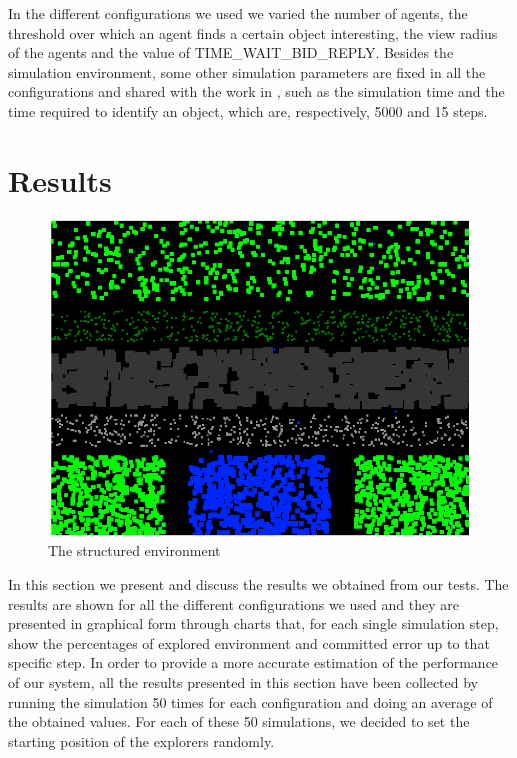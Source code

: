 \documentclass[a4paper, 10pt, conference]{ieeeconf}      %
\begin{document}
In the different configurations we used we varied the number of agents, the threshold over which an agent finds a certain object interesting, the view radius of the agents and the value of TIME\_WAIT\_BID\_REPLY. Besides the simulation environment, some other simulation parameters are fixed in all the configurations and shared with the work in \cite{tavaresgaspar}, such as the simulation time and the time required to identify an object, which are, respectively, 5000 and 15 steps.


\section{Results}\label{sec:resuslts}

\begin{figure}[h]
	\centering
	\includegraphics[width=1\linewidth]{img/structured-environment.png}
	\caption{The structured environment}
	\label{fig:structured-environment}
\end{figure}

In this section we present and discuss the results we obtained from our tests. The results are shown for all the different configurations we used and they are presented in graphical form through charts that, for each single simulation step, show the percentages of explored environment and committed error up to that specific step. In order to provide a more accurate estimation of the performance of our system, all the results presented in this section have been collected by running the simulation 50 times for each configuration and doing an average of the obtained values. For each of these 50 simulations, we decided to set the starting position of the explorers randomly.
\end{document}
